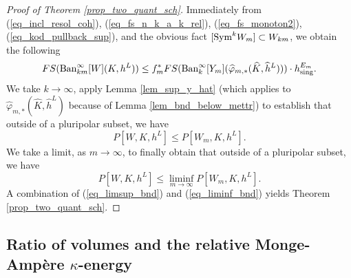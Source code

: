 \documentclass[12pt]{article}
\numberwithin{equation}{section}
\theoremstyle{theorem}
\theoremstyle{definition}
\theoremstyle{remark}
\begin{document}
\begin{proof}[Proof of Theorem \ref{prop_two_quant_sch}]
		Immediately from (\ref{eq_incl_resol_coh}), (\ref{eq_fs_n_k_a_k_rel}), (\ref{eq_fs_monoton2}), (\ref{eq_kod_pullback_sup}), and the obvious fact $[{\rm{Sym}}^k W_m] \subset W_{km}$, we obtain the following
		\begin{equation}\label{eq_fs_abov_bnd}
			FS({\textrm{Ban}}_{km}^{\infty}[W](K, h^L))
			\leq
			f_m^*
			FS(\textrm{Ban}_{k}^{\infty}[Y_m](\widehat{\varphi}_{m, *} (\widehat{K}, \widehat{h}^L)))
			\cdot
			h^{E_m}_{\rm{sing}}.
		\end{equation}
		We take $k \to \infty$, apply Lemma \ref{lem_sup_y_hat} (which applies to $\widehat{\varphi}_{m, *} (\widehat{K}, \widehat{h}^L)$ because of Lemma \ref{lem_bnd_below_mettr}) to establish that outside of a pluripolar subset, we have
		\begin{equation}
			P[W, K, h^L]
			\leq
			P[W_m, K, h^L].
		\end{equation}
		We take a limit, as $m \to \infty$, to finally obtain that outside of a pluripolar subset, we have
		\begin{equation}\label{eq_liminf_bnd}
			P[W, K, h^L]
			\leq
			\liminf_{m \to \infty}
			P[W_m, K, h^L].
		\end{equation}
		A combination of (\ref{eq_limsup_bnd}) and (\ref{eq_liminf_bnd}) yields Theorem \ref{prop_two_quant_sch}.
	\end{proof}
		
	\subsection{Ratio of volumes and the relative Monge-Ampère $\kappa$-energy}\label{sect_vol_balls}
	
\end{document}
